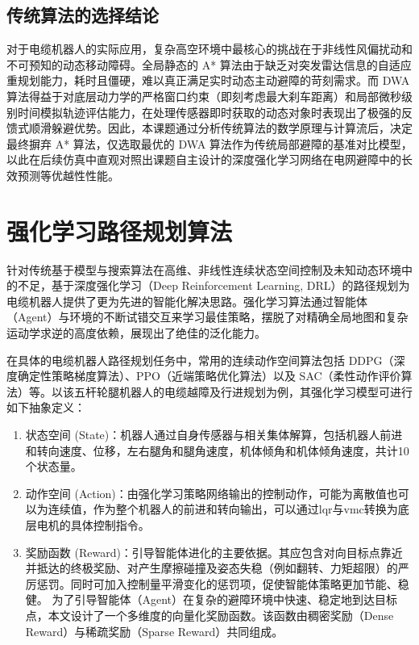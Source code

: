 \documentclass[
  oneside,
  degree=bachelor,
  fullwidthstop=false,
  fontset=fandol,
  times=false,
  minted=true,
  biblatex=true,
]{tongjithesis}
\begin{document}
\subsection{传统算法的选择结论}
对于电缆机器人的实际应用，复杂高空环境中最核心的挑战在于非线性风偏扰动和不可预知的动态移动障碍。全局静态的 A* 算法由于缺乏对突发雷达信息的自适应重规划能力，耗时且僵硬，难以真正满足实时动态主动避障的苛刻需求。而 DWA 算法得益于对底层动力学的严格窗口约束（即刻考虑最大刹车距离）和局部微秒级别时间模拟轨迹评估能力，在处理传感器即时获取的动态对象时表现出了极强的反馈式顺滑躲避优势。因此，本课题通过分析传统算法的数学原理与计算流后，决定最终摒弃 A* 算法，仅选取最优的 DWA 算法作为传统局部避障的基准对比模型，以此在后续仿真中直观对照出课题自主设计的深度强化学习网络在电网避障中的长效预测等优越性性能。

\section{强化学习路径规划算法}
针对传统基于模型与搜索算法在高维、非线性连续状态空间控制及未知动态环境中的不足，基于深度强化学习（Deep Reinforcement Learning, DRL）的路径规划为电缆机器人提供了更为先进的智能化解决思路。强化学习算法通过智能体（Agent）与环境的不断试错交互来学习最佳策略，摆脱了对精确全局地图和复杂运动学求逆的高度依赖，展现出了绝佳的泛化能力。

在具体的电缆机器人路径规划任务中，常用的连续动作空间算法包括 DDPG（深度确定性策略梯度算法）、PPO（近端策略优化算法）以及 SAC（柔性动作评价算法）等。以该五杆轮腿机器人的电缆越障及行进规划为例，其强化学习模型可进行如下抽象定义：
\begin{enumerate}
    \item 状态空间 (State)：机器人通过自身传感器与相关集体解算，包括机器人前进和转向速度、位移，左右腿角和腿角速度，机体倾角和机体倾角速度，共计10个状态量。
    \item 动作空间 (Action)：由强化学习策略网络输出的控制动作，可能为离散值也可以为连续值，作为整个机器人的前进和转向输出，可以通过lqr与vmc转换为底层电机的具体控制指令。
    \item 奖励函数 (Reward)：引导智能体进化的主要依据。其应包含对向目标点靠近并抵达的终极奖励、对产生摩擦碰撞及姿态失稳（例如翻转、力矩超限）的严厉惩罚。同时可加入控制量平滑变化的惩罚项，促使智能体策略更加节能、稳健。
    为了引导智能体（Agent）在复杂的避障环境中快速、稳定地到达目标点，本文设计了一个多维度的向量化奖励函数。该函数由稠密奖励（Dense Reward）与稀疏奖励（Sparse Reward）共同组成。
\end{enumerate}
\end{document}

